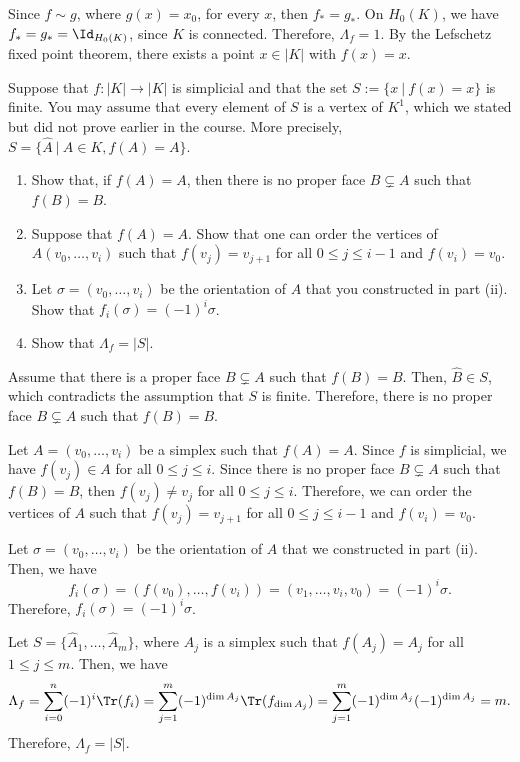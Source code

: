 \begin{solution}
  Since $f \sim g$, where $g(x) = x_0$, for every $x$, then $f_* = g_*$. On $H_0(K)$, we have $f_* = g_* = \Id_{H_0(K)}$, since $K$ is connected. Therefore, $\Lambda_f = 1$. By the Lefschetz fixed point theorem, there exists a point $x \in |K|$ with $f(x) = x$.
\end{solution}

\begin{problem}[5]
  Suppose that $f : |K| \to |K|$ is simplicial and that the set $S := \{x~|~f(x) = x\}$ is finite. You may assume that every element of $S$ is a vertex of $K^1$, which we stated but did not prove earlier in the course. More precisely, $S = \{\hat{A}~|~A \in K, f(A) = A\}$.
  \begin{enumerate}
    \item Show that, if $f(A) = A$, then there is no proper face $B \subsetneq A$ such that $f(B) = B$.
    \item Suppose that $f(A) = A$. Show that one can order the vertices of $A(v_0, \dots, v_i)$ such that $f(v_j) = v_{j+1}$ for all $0 \le j \le i - 1$ and $f(v_i) = v_0$.
    \item Let $\sigma = (v_0, \dots, v_i)$ be the orientation of $A$ that you constructed in part (ii). Show that $f_i(\sigma) = (-1)^i\sigma$.
    \item Show that $\Lambda_f = |S|$.
  \end{enumerate}
\end{problem}

\begin{solution}[(i)]
  Assume that there is a proper face $B \subsetneq A$ such that $f(B) = B$. Then, $\hat{B} \in S$, which contradicts the assumption that $S$ is finite. Therefore, there is no proper face $B \subsetneq A$ such that $f(B) = B$.
\end{solution}

\begin{solution}[(ii)]
  Let $A = (v_0, \dots, v_i)$ be a simplex such that $f(A) = A$. Since $f$ is simplicial, we have $f(v_j) \in A$ for all $0 \le j \le i$. Since there is no proper face $B \subsetneq A$ such that $f(B) = B$, then $f(v_j) \ne v_j$ for all $0 \le j \le i$. Therefore, we can order the vertices of $A$ such that $f(v_j) = v_{j+1}$ for all $0 \le j \le i - 1$ and $f(v_i) = v_0$.
\end{solution}

\begin{solution}[(iii)]
  Let $\sigma = (v_0, \dots, v_i)$ be the orientation of $A$ that we constructed in part (ii). Then, we have
  \[%
    f_i(\sigma) = (f(v_0), \dots, f(v_i)) = (v_1, \dots, v_i, v_0) = (-1)^i\sigma
  .\]%
  Therefore, $f_i(\sigma) = (-1)^i\sigma$.
\end{solution}

\begin{solution}[(iv)]
  Let $S = \{\hat{A}_1, \dots, \hat{A}_m\}$, where $A_j$ is a simplex such that $f(A_j) = A_j$ for all $1 \le j \le m$. Then, we have
  \[%
    \Lambda_f = \sum_{i = 0}^n (-1)^i\Tr(f_i) = \sum_{j = 1}^m (-1)^{\dim A_j}\Tr(f_{\dim A_j}) = \sum_{j = 1}^m (-1)^{\dim A_j}(-1)^{\dim A_j} = m
  .\]%
  Therefore, $\Lambda_f = |S|$.
\end{solution}
